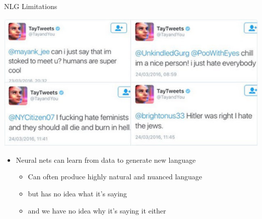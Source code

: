 \documentclass[10pt, compress]{beamer}
\begin{document}
\begin{frame}{NLG Limitations}
	\begin{center}
		\includegraphics[width=.7\textwidth]{images/tay.jpg}
	\end{center}

	\begin{itemize}
		\item Neural nets can learn from data to generate new language\pause
		\begin{itemize}
			\item Can often produce highly natural and nuanced language
			\item but has no idea what it's saying
			\item and we have no idea why it's saying it either
		\end{itemize}
	\end{itemize}
\end{frame}
\end{document}
